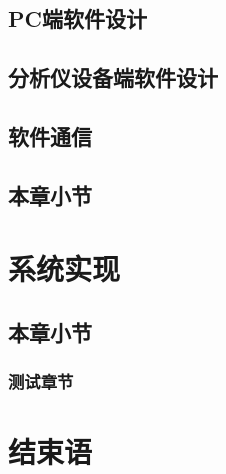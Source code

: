 \section{PC端软件设计}
\section{分析仪设备端软件设计}
\section{软件通信}
\section{本章小节}
\chapter{系统实现}

\section{本章小节}
\subsection{测试章节}

\chapter{结束语}


